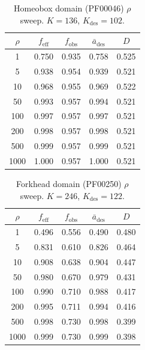\begin{table}[ht]
  \centering
  \caption{Homeobox domain (PF00046) $\rho$ sweep. $K=136$, $K_{\mathrm{des}}=102$.}
  \label{tab:homeobox-rho}
  \small
  \begin{tabular}{ccccc}
    \toprule
    $\rho$ & $f_{\mathrm{eff}}$ & $f_{\mathrm{obs}}$ & $\bar{a}_{\mathrm{des}}$ & $D$ \\
    \midrule
    1    & 0.750 & 0.935 & 0.758 & 0.525 \\
    5    & 0.938 & 0.954 & 0.939 & 0.521 \\
    10   & 0.968 & 0.955 & 0.969 & 0.522 \\
    50   & 0.993 & 0.957 & 0.994 & 0.521 \\
    100  & 0.997 & 0.957 & 0.997 & 0.521 \\
    200  & 0.998 & 0.957 & 0.998 & 0.521 \\
    500  & 0.999 & 0.957 & 0.999 & 0.521 \\
    1000 & 1.000 & 0.957 & 1.000 & 0.521 \\
    \bottomrule
  \end{tabular}
\end{table}

\begin{table}[ht]
  \centering
  \caption{Forkhead domain (PF00250) $\rho$ sweep. $K=246$, $K_{\mathrm{des}}=122$.}
  \label{tab:forkhead-rho}
  \small
  \begin{tabular}{ccccc}
    \toprule
    $\rho$ & $f_{\mathrm{eff}}$ & $f_{\mathrm{obs}}$ & $\bar{a}_{\mathrm{des}}$ & $D$ \\
    \midrule
    1    & 0.496 & 0.556 & 0.490 & 0.480 \\
    5    & 0.831 & 0.610 & 0.826 & 0.464 \\
    10   & 0.908 & 0.638 & 0.904 & 0.447 \\
    50   & 0.980 & 0.670 & 0.979 & 0.431 \\
    100  & 0.990 & 0.710 & 0.988 & 0.417 \\
    200  & 0.995 & 0.711 & 0.994 & 0.416 \\
    500  & 0.998 & 0.730 & 0.998 & 0.399 \\
    1000 & 0.999 & 0.730 & 0.999 & 0.398 \\
    \bottomrule
  \end{tabular}
\end{table}

